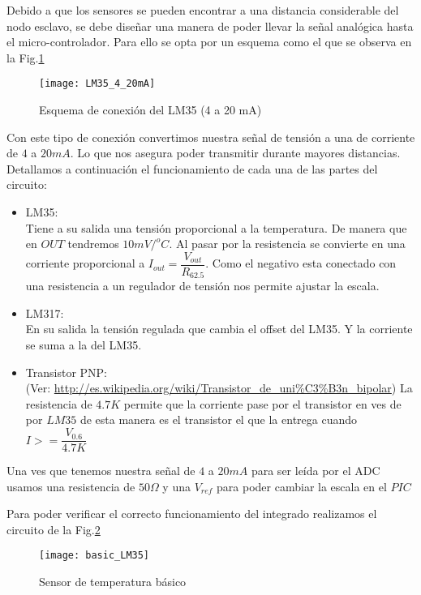 Debido a que los sensores se pueden encontrar a una distancia considerable del nodo esclavo, 
se debe diseñar una manera de poder llevar la señal analógica hasta el micro-controlador. 
Para ello se opta por un esquema como el que se observa en la Fig.\ref{fig:LM35_4_20mA}

\begin{figure}[H] %
  \begin{center}
  \texttt{[image: LM35\_4\_20mA]}
  \end{center}
  \caption{Esquema de conexión del LM35 (4 a 20 mA) }
  \label{fig:LM35_4_20mA}
\end{figure}

Con este tipo de conexión convertimos nuestra señal de tensión a una de corriente de $4$ a $20mA$.
Lo que nos asegura poder transmitir durante mayores distancias.
Detallamos a continuación el funcionamiento de cada una de las partes del circuito:
\begin{itemize}
 \item LM35:\\ 
    Tiene a su salida una tensión proporcional a la temperatura. De manera que en $OUT$
    tendremos $10mV/^oC$. Al pasar por la resistencia se convierte en una corriente 
    proporcional a $I_{out}=\dfrac{V_{out}}{R_{62.5}}$. Como el negativo esta conectado
    con una resistencia a un regulador de tensión nos permite ajustar la escala. 
 \item LM317: \\
    En su salida la tensión regulada que cambia el offset del LM35. Y la corriente se suma
    a la del LM35. 
 \item Transistor PNP:\\
    (Ver: \url{http://es.wikipedia.org/wiki/Transistor_de_uni%C3%B3n_bipolar})
    La resistencia de $4.7K$ permite que la corriente pase por el transistor en ves de por $LM35$
    de esta manera es el transistor el que la entrega cuando $I>=\dfrac{V_{0.6}}{4.7K}$
\end{itemize}
Una ves que tenemos nuestra señal de $4$ a $20mA$ para ser leída por el ADC usamos una resistencia 
de $50 \Omega$ y una $V_{ref}$ para poder cambiar la escala en el $PIC$

Para poder verificar el correcto funcionamiento del integrado realizamos el circuito
de la Fig.\ref{fig:basic_LM35}
\begin{figure}[H] %
  \begin{center}
  \texttt{[image: basic\_LM35]}
  \end{center}
  \caption{Sensor de temperatura básico}
  \label{fig:basic_LM35}
\end{figure}



